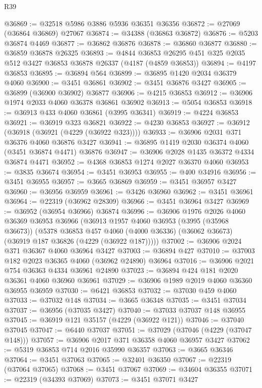 \begin{lexlean}{R39}
\begin{coremodule}
@36869 := @32518 @5986 @3886 @5936 @36351 @36356
@36872 := @27069 (@36864 @36869) @27067
@36874 := @34388 (@36863 @36872)
@36876 := @5203 @36874 @4469
@36877 := @36862 @36876
@36878 := @36860 @36877
@36880 := @36859 @36878 @26325
@36893 := @4844 @36853 @26295 @451 @325 @2035 @512 @3427 @36853 @36878 @26337 (@4187 (@4859 @36853))
@36894 := @4197 @36853
@36895 := @36894 @564
@36899 := @36895 @1420 @2034 @36379 @4060
@36900 := @3451 @36861
@36902 := @3451 @36876 @3427
@36905 := @36899 (@36900 @36902) @36877
@36906 := @4215 @36853
@36912 := @36906 @1974 @2033 @4060 @36378 @36861 @36902
@36913 := @5054 @36853
@36918 := @36913 @433 @4060 @36861 (@3995 @36341)
@36919 := @4224 @36853
@36921 := @36919 @323 @36821
@36922 := @4230 @36853
@36927 := @36912 (@36918 (@36921 (@4229 (@36922 @323))))
@36933 := @36906 @2031 @371 @36376 @4060 @36876 @3427
@36941 := @36895 @1419 @2030 @36374 @4060 (@3451 @36874 @4471) @36876
@36947 := @36906 @2028 @1435 @36372 @4334 @36874 @4471
@36952 := @4368 @36853 @1274 @2027 @36370 @4060
@36953 := @3835 @36674
@36954 := @3451 @36953
@36955 := @400 @34916
@36956 := @3451 @36955
@36957 := @3665 @36869
@36959 := @3451 @36957 @3427
@36960 := @36956 @36959
@36961 := @3426 @36960
@36962 := @3451 @36961
@36964 := @22319 (@36962 @28309)
@36966 := @3451 @36964 @3427
@36969 := @36952 (@36954 @36966) @36874
@36996 := @36906
    @1976
    @2026
    @4060
    @36369
    @36953
    @36966
    (@36913
      @1957
      @4060
      @36953
      (@3995 (@35968 @36673))
      (@5378
        @36853
        @457
        @4060
        (@4000 @36336)
        (@36062 @36673)
        (@36919 @187 @36826 (@4229 (@36922 @187)))))
@37002 := @36906 @2024 @371 @36367 @4060 @36964 @3427
@37003 := @36894 @427
@37010 := @37003 @182 @2023 @36365 @4060 (@36962 @24890) @36964
@37016 := @36906 @2021 @754 @36363 @4334 @36961 @24890
@37023 := @36894 @424 @181 @2020 @36361 @4060 @36960 @36961
@37029 := @36906 @1989 @2019 @4060 @36360 @36955 @36959
@37030 := @6421 @36853
@37032 := @37030 @459 @4060
@37033 := @37032 @148
@37034 := @3665 @36348
@37035 := @3451 @37034
@37037 := @36956 (@37035 @3427)
@37040 := @37033 @37037 @148 @36955
@37045 := @36919 @121 @35157 (@4229 (@36922 @121))
@37046 := @37040 @37045
@37047 := @6440 @37037
@37051 := @37029 (@37046 (@4229 (@37047 @148)))
@37057 := @36906 @2017 @371 @36358 @4060 @36957 @3427
@37062 := @5319 @36853 @714 @2016 @35990 @36357
@37063 := @3665 @36346
@37064 := @3451 @37063
@37065 := @32401 @36350
@37067 := @22319 (@37064 @37065)
@37068 := @3451 @37067
@37069 := @34604 @36355
@37071 := @22319 (@34393 @37069)
@37073 := @3451 @37071 @3427

\end{coremodule}
\end{lexlean}
